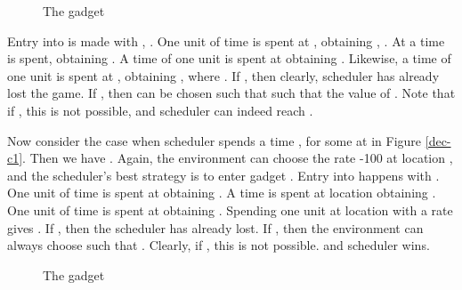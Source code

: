 \begin{enumerate}
\begin{figure}[h]
\begin{center}
{}
\caption{The gadget }
\label{dec-c1-more}
\end{center}
\end{figure}

Entry into  is made with , . One unit 
of time is spent at , obtaining , . 
At  a time  is spent, obtaining .
A time of one unit is spent at  obtaining . 
Likewise, a time of one unit is spent at , obtaining , where 
. If , then clearly, scheduler has already lost the game.
If , then  can be chosen such that  
such that the value of . Note that if , this is not possible, and 
scheduler can indeed reach  .  

        
Now consider the case when scheduler spends a time  , for some  at  in Figure \ref{dec-c1}. 
 Then we have . Again, the environment can choose the rate -100 at location , 
 and the scheduler's best strategy is to enter gadget . Entry into  happens with 
          . 
     One unit of time is spent at  obtaining . 
     A time   is spent at location  obtaining 
     . 
     One unit of time is spent at  obtaining . 
    Spending one unit at location   with a rate  
  gives . 
 If , then the scheduler has already lost. If ,
 then the environment can always choose   such that 
 . Clearly, if , this 
 is not possible. and scheduler wins. 
    
          
                      
\begin{figure}[h]
\begin{center}
\caption{The gadget }
\label{dec-c1-less}
\end{center}
\end{figure}



\end{enumerate}
